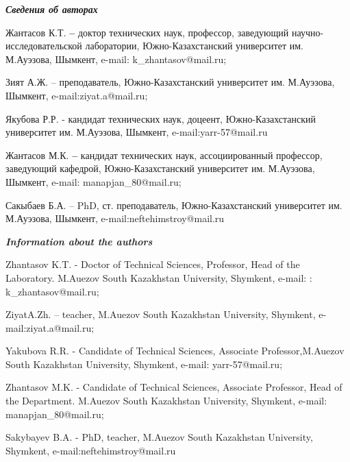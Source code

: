 \emph{{\bfseries Сведения об авторах}}

Жантасов К.Т. {\bfseries --} доктор технических наук, профессор, заведующий
научно-исследовательской лаборатории, Южно-Казахстанский университет им.
М.Ауэзова, Шымкент, e-mail: k\_zhantasov@mail.ru;

Зият А.Ж. -- преподаватель, Южно-Казахстанский университет им.
М.Ауэзова, Шымкент, e-mail:ziyat.a@mail.ru;

Якубова Р.Р. - кандидат технических наук, доцеент, Южно-Казахстанский
университет им. М.Ауэзова, Шымкент, e-mail:yarr-57@mail.ru

Жантасов М.К. {\bfseries --} кандидат технических наук, ассоциированный
профессор, заведующий кафедрой, Южно-Казахстанский университет им.
М.Ауэзова, Шымкент, e-mail: manapjan\_80@mail.ru;

Сакыбаев Б.А. -- PhD, ст. преподаватель, Южно-Казахстанский университет
им. М.Ауэзова, Шымкент, e-mail:neftehimstroy@mail.ru

\emph{{\bfseries Information about the authors}}

Zhantasov K.T. - Doctor of Technical Sciences, Professor, Head of the
Laboratory. M.Auezov South Kazakhstan University, Shymkent, e-mail: :
k\_zhantasov@mail.ru;

ZiyatA.Zh. -- teacher, M.Auezov South Kazakhstan University, Shymkent,
e-mail:ziyat.a@mail.ru;

Yakubova R.R. - Candidate of Technical Sciences, Associate
Professor,M.Auezov South Kazakhstan University, Shymkent, e-mail:
yarr-57@mail.ru;

Zhantasov M.K. - Candidate of Technical Sciences, Associate Professor,
Head of the Department. M.Auezov South Kazakhstan University, Shymkent,
e-mail: manapjan\_80@mail.ru;

Sakybayev B.A. - PhD, teacher, M.Auezov South Kazakhstan University,
Shymkent, e-mail:neftehimstroy@mail.ru
